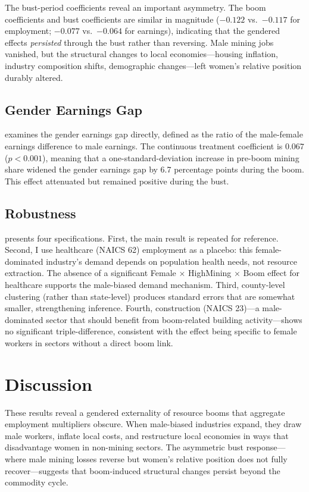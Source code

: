 \documentclass[12pt]{article}
\begin{document}
The bust-period coefficients reveal an important asymmetry. The boom coefficients and bust coefficients are similar in magnitude ($-0.122$ vs.\ $-0.117$ for employment; $-0.077$ vs.\ $-0.064$ for earnings), indicating that the gendered effects \textit{persisted} through the bust rather than reversing. Male mining jobs vanished, but the structural changes to local economies---housing inflation, industry composition shifts, demographic changes---left women's relative position durably altered.

\subsection{Gender Earnings Gap}

 examines the gender earnings gap directly, defined as the ratio of the male-female earnings difference to male earnings. The continuous treatment coefficient is $0.067$ ($p < 0.001$), meaning that a one-standard-deviation increase in pre-boom mining share widened the gender earnings gap by 6.7 percentage points during the boom. This effect attenuated but remained positive during the bust.

\subsection{Robustness}

 presents four specifications. First, the main result is repeated for reference. Second, I use healthcare (NAICS 62) employment as a placebo: this female-dominated industry's demand depends on population health needs, not resource extraction. The absence of a significant Female $\times$ HighMining $\times$ Boom effect for healthcare supports the male-biased demand mechanism. Third, county-level clustering (rather than state-level) produces standard errors that are somewhat smaller, strengthening inference. Fourth, construction (NAICS 23)---a male-dominated sector that should benefit from boom-related building activity---shows no significant triple-difference, consistent with the effect being specific to female workers in sectors without a direct boom link.

\section{Discussion}

These results reveal a gendered externality of resource booms that aggregate employment multipliers obscure. When male-biased industries expand, they draw male workers, inflate local costs, and restructure local economies in ways that disadvantage women in non-mining sectors. The asymmetric bust response---where male mining losses reverse but women's relative position does not fully recover---suggests that boom-induced structural changes persist beyond the commodity cycle.
\end{document}
